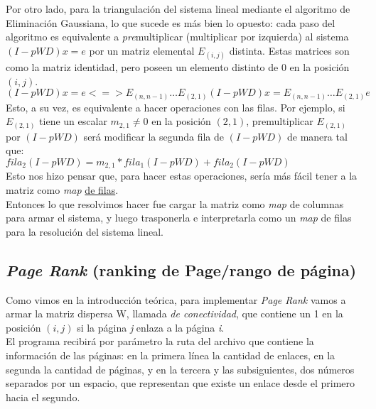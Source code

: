 		Por otro lado, para la triangulación del sistema lineal mediante el algoritmo de Eliminación Gaussiana, lo que sucede es más bien lo opuesto: cada paso del algoritmo es equivalente a \textit{pre}multiplicar (multiplicar por izquierda) al sistema $(I - pWD) x = e$ por un matriz elemental $E_{(i,j)}$ distinta. Estas matrices son como la matriz identidad, pero poseen un elemento distinto de $0$ en la posición $(i,j)$. \\

		$ (I - pWD) x = e <=> E_{(n,n-1)} \hdots E_{(2,1)} (I - pWD) x = E_{(n,n-1)} \hdots E_{(2,1)} e $ \\

		Esto, a su vez, es equivalente a hacer operaciones con las filas. Por ejemplo, si $E_{(2,1)}$ tiene un escalar $m_{2,1} \neq 0$ en la posición $(2,1)$, premultiplicar $E_{(2,1)}$ por $(I - pWD)$ será modificar la segunda fila de $(I - pWD)$ de manera tal que: \\

		$fila_{2}(I-pWD) = m_{2,1} *  fila_{1}(I-pWD) + fila_{2}(I-pWD)$ \\

		Esto nos hizo pensar que, para hacer estas operaciones, sería más fácil tener a la matriz como \textit{map} \underline{de filas}. \\

		Entonces lo que resolvimos hacer fue cargar la matriz como \textit{map} de columnas para armar el sistema, y luego trasponerla e interpretarla como un \textit{map} de filas para la resolución del sistema lineal. \\

	\subsection{\textit{Page Rank} (ranking de Page/rango de página)}

		Como vimos en la introducción teórica, para implementar \textit{Page Rank} vamos a armar la matriz dispersa W, llamada \textit{de conectividad}, que contiene un 1 en la posición $(i,j)$ si la página \textit{j} enlaza a la página \textit{i}. \\

		El programa recibirá por parámetro la ruta del archivo que contiene la información de las páginas: en la primera línea la cantidad de enlaces, en la segunda la cantidad de páginas, y en la tercera y las subsiguientes, dos números separados por un espacio, que representan que existe un enlace desde el primero hacia el segundo. \\

